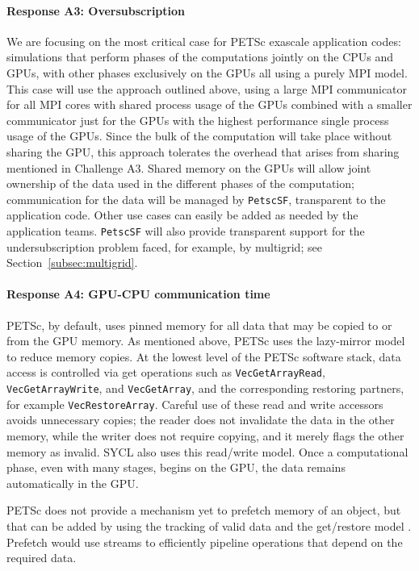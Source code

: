 \documentclass[10pt,journal,compsoc]{IEEEtran}
\begin{document}
\paragraph{Response A3: Oversubscription}

We are focusing on the most critical case for PETSc exascale application codes: simulations that perform phases of the computations jointly on the CPUs and GPUs, with other phases exclusively on the
GPUs all using a purely MPI model. This case will use the approach outlined above, using a large MPI communicator for all MPI cores with shared process usage of the GPUs
combined with a smaller communicator just for the GPUs with the highest performance single process usage of the GPUs. Since the bulk of the computation 
will take place without sharing the GPU, this approach tolerates the overhead that arises from sharing mentioned in Challenge A3. Shared memory on the 
GPUs will allow joint ownership of the data used in the different phases of the computation; communication for the data will be managed by {\tt PetscSF}, transparent to the application code. 
Other use cases can easily be added as needed by the application teams. {\tt PetscSF} will also provide transparent support for the undersubscription problem faced, for example, by multigrid; see Section~\ref{subsec:multigrid}. 


\paragraph{Response A4: GPU-CPU communication time} 

PETSc, by default, uses pinned memory for all data that may be copied to or from the GPU memory. As mentioned above, PETSc uses the lazy-mirror model to reduce memory copies.
At the lowest level of the PETSc software stack, data access is controlled via get operations such as {\tt VecGetArrayRead}, {\tt VecGetArrayWrite}, and {\tt VecGetArray}, and the
corresponding restoring partners, for example {\tt VecRestoreArray}. Careful use of these read and write accessors avoids unnecessary copies; the reader does not invalidate the data in the other memory, while the writer does not require copying, and it merely flags the other memory as invalid. SYCL also uses this read/write model. Once a computational phase, even with many stages, begins on the GPU, the data remains automatically in the GPU.

PETSc does not provide a mechanism yet to prefetch memory of an object, but that can be added by using the tracking of valid data and the get/restore model \cite{bkmms2012}.
Prefetch would use streams to efficiently pipeline operations that depend on the required data.
\end{document}
